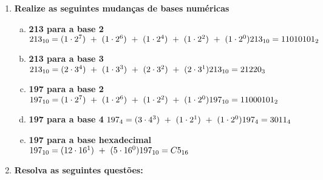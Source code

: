 \documentclass{article}
\begin{document}
      \begin{enumerate}
        \item \textbf{Realize as seguintes mudanças de bases numéricas}
        \begin{enumerate}[(a)]
          \item \textbf{ 213 para a base 2}
            \begin{math}
              \\ 213_{10} = (1 \cdot 2^{7}) \ + \ (1 \cdot 2^{6}) \ + \ (1 \cdot 2^{4}) \ + \ (1 \cdot 2^{2}) \ + \ (1 \cdot 2^{0})
              \\ 213_{10} = 11010101_{2}
            \end{math}
          \item \textbf{213 para a base 3}
            \begin{math}
              \\ 213_{10} = (2 \cdot 3^{4}) \ + \ (1 \cdot 3^{3}) \ + \ (2 \cdot 3^{2}) \ + \ (2 \cdot 3^{1})
              \\ 213_{10} = 21220_{3}
            \end{math}
          \item \textbf{197 para a base 2}
            \begin{math}
              \\ 197_{10} = (1 \cdot 2^{7}) \ + \ (1 \cdot 2^{6}) \ + \ (1 \cdot 2 ^{2}) \ + \ (1 \cdot 2^{0})
              \\ 197_{10} = 11000101_{2}
            \end{math}
          \item \textbf{197 para a base 4}
            \begin{math}
              \\ 197_{4} = (3 \cdot 4^{3}) \ + \ (1 \cdot 2^{1}) \ + \ (1 \cdot 2^{0})
              \\ 197_{4} = 3011_{4}
            \end{math}
          \item \textbf{197 para a base hexadecimal}
            \begin{math}
              \\ 197_{10} = (12 \cdot 16^{1}) \ + \ (5 \cdot 16^{0})
              \\ 197_{10} = C5_{16}
            \end{math}
        \end{enumerate}
        \item \textbf{Resolva as seguintes questões:}
        \begin{enumerate}[(a)]

\end{enumerate}
\end{enumerate}
\end{document}
